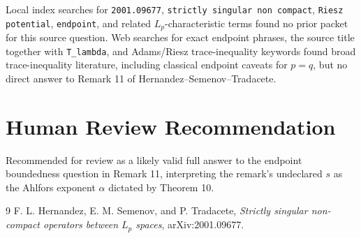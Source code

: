 \documentclass[11pt]{article}
\begin{document}
Local index searches for \texttt{2001.09677}, \texttt{strictly singular non compact},
\texttt{Riesz potential}, \texttt{endpoint}, and related \(L_p\)-characteristic terms found no
prior packet for this source question. Web searches for exact endpoint phrases,
the source title together with \texttt{T\_lambda}, and Adams/Riesz trace-inequality
keywords found broad trace-inequality literature, including classical endpoint
caveats for \(p=q\), but no direct answer to Remark 11 of
Hernandez--Semenov--Tradacete.

\section*{Human Review Recommendation}

Recommended for review as a likely valid full answer to the endpoint boundedness
question in Remark 11, interpreting the remark's undeclared \(s\) as the
Ahlfors exponent \(\alpha\) dictated by Theorem 10.

\begin{thebibliography}{9}
F. L. Hernandez, E. M. Semenov, and P. Tradacete,
\emph{Strictly singular non-compact operators between \(L_p\) spaces},
arXiv:2001.09677.
\end{thebibliography}
\end{document}
